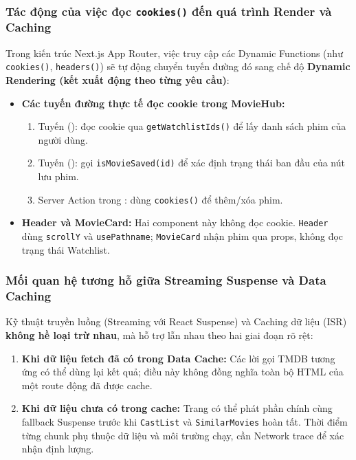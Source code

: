 \documentclass[12pt,a4paper]{extarticle}
\begin{document}
\subsubsection{Tác động của việc đọc \texttt{cookies()} đến quá trình Render và Caching}
Trong kiến trúc Next.js App Router, việc truy cập các Dynamic Functions (như \texttt{cookies()}, \texttt{headers()}) sẽ tự động chuyển tuyến đường đó sang chế độ \textbf{Dynamic Rendering (kết xuất động theo từng yêu cầu)}:
\begin{itemize}[noitemsep]
    \item \textbf{Các tuyến đường thực tế đọc cookie trong MovieHub:} 
    \begin{enumerate}[noitemsep]
        \item Tuyến  (): đọc cookie qua \texttt{getWatchlistIds()} để lấy danh sách phim của người dùng.
        \item Tuyến  (): gọi \texttt{isMovieSaved(id)} để xác định trạng thái ban đầu của nút lưu phim.
        \item Server Action trong : dùng \texttt{cookies()} để thêm/xóa phim.
    \end{enumerate}
    \item \textbf{Header và MovieCard:} Hai component này không đọc cookie. \texttt{Header} dùng \texttt{scrollY} và \texttt{usePathname}; \texttt{MovieCard} nhận phim qua props, không đọc trạng thái Watchlist.
\end{itemize}

\subsubsection{Mối quan hệ tương hỗ giữa Streaming Suspense và Data Caching}
Kỹ thuật truyền luồng (Streaming với React Suspense) và Caching dữ liệu (ISR) \textbf{không hề loại trừ nhau}, mà hỗ trợ lẫn nhau theo hai giai đoạn rõ rệt:
\begin{enumerate}[noitemsep]
    \item \textbf{Khi dữ liệu fetch đã có trong Data Cache:} Các lời gọi TMDB tương ứng có thể dùng lại kết quả; điều này không đồng nghĩa toàn bộ HTML của một route động đã được cache.
    \item \textbf{Khi dữ liệu chưa có trong cache:} Trang  có thể phát phần chính cùng fallback Suspense trước khi \texttt{CastList} và \texttt{SimilarMovies} hoàn tất. Thời điểm từng chunk phụ thuộc dữ liệu và môi trường chạy, cần Network trace để xác nhận định lượng.
\end{enumerate}
\end{document}
